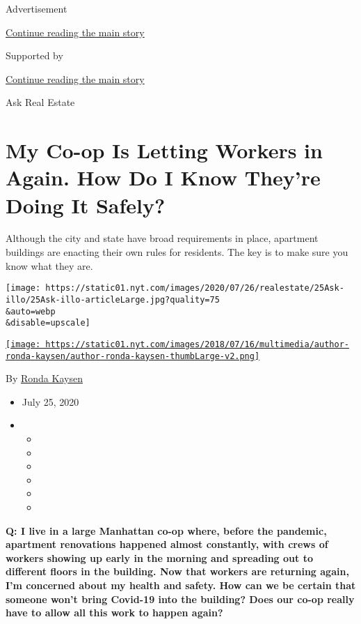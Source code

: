 Advertisement

\protect\hyperlink{after-top}{Continue reading the main story}

Supported by

\protect\hyperlink{after-sponsor}{Continue reading the main story}

Ask Real Estate

\hypertarget{my-co-op-is-letting-workers-in-again-how-do-i-know-theyre-doing-it-safely}{%
\section{My Co-op Is Letting Workers in Again. How Do I Know They're
Doing It
Safely?}\label{my-co-op-is-letting-workers-in-again-how-do-i-know-theyre-doing-it-safely}}

Although the city and state have broad requirements in place, apartment
buildings are enacting their own rules for residents. The key is to make
sure you know what they are.

\texttt{[image: https://static01.nyt.com/images/2020/07/26/realestate/25Ask-illo/25Ask-illo-articleLarge.jpg?quality=75\\\&auto=webp\\\&disable=upscale]}

\href{https://www.nytimes.com/by/ronda-kaysen}{\texttt{[image: https://static01.nyt.com/images/2018/07/16/multimedia/author-ronda-kaysen/author-ronda-kaysen-thumbLarge-v2.png]}}

By \href{https://www.nytimes.com/by/ronda-kaysen}{Ronda Kaysen}

\begin{itemize}
\item
  July 25, 2020
\item
  \begin{itemize}
  \item
  \item
  \item
  \item
  \item
  \item
  \end{itemize}
\end{itemize}

\textbf{Q: I live in a large Manhattan co-op where, before the pandemic,
apartment renovations happened almost constantly, with crews of workers
showing up early in the morning and spreading out to different floors in
the building. Now that workers are returning again, I'm concerned about
my health and safety. How can we be certain that someone won't bring
Covid-19 into the building? Does our co-op really have to allow all this
work to happen again?}

